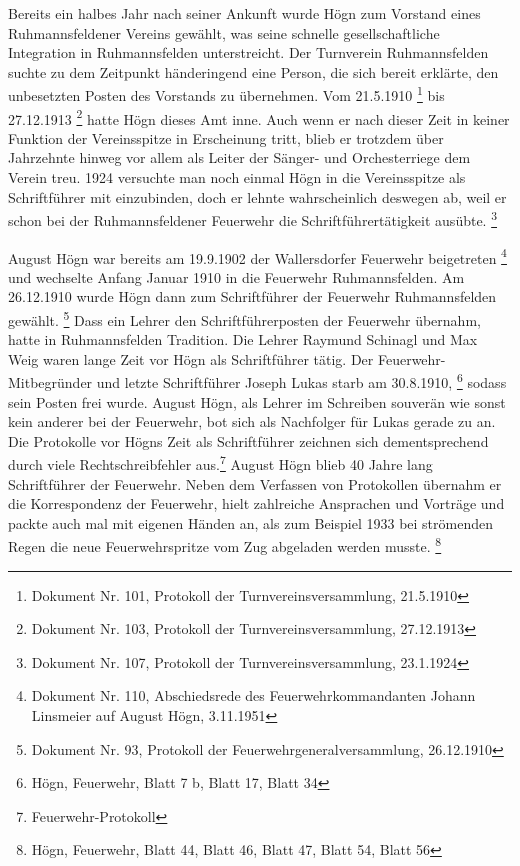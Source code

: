 \documentclass[a4paper]{article}
\begin{document}
Bereits ein halbes Jahr nach seiner Ankunft wurde Högn zum Vorstand
eines Ruhmannsfeldener Vereins gewählt, was seine schnelle
gesellschaftliche Integration in Ruhmannsfelden unterstreicht. Der
Turnverein Ruhmannsfelden suchte zu dem Zeitpunkt händeringend eine
Person, die sich bereit erklärte, den unbesetzten Posten des Vorstands
zu übernehmen. Vom 21.5.1910 \footnote{Dokument Nr. 101, Protokoll der
Turnvereinsversammlung, 21.5.1910}  bis 27.12.1913 \footnote{Dokument
Nr. 103, Protokoll der Turnvereinsversammlung, 27.12.1913} hatte Högn
dieses Amt inne. Auch wenn er nach dieser Zeit in keiner Funktion der
Vereinsspitze in Erscheinung tritt, blieb er trotzdem über Jahrzehnte
hinweg vor allem als Leiter der Sänger- und Orchesterriege dem Verein
treu. 1924 versuchte man noch einmal Högn in die Vereinsspitze als
Schriftführer mit einzubinden, doch er lehnte wahrscheinlich deswegen
ab, weil er schon bei der Ruhmannsfeldener Feuerwehr die
Schriftführertätigkeit ausübte. \footnote{Dokument Nr. 107, Protokoll
der Turnvereinsversammlung, 23.1.1924}

August Högn war bereits am 19.9.1902 der Wallersdorfer Feuerwehr
beigetreten \footnote{Dokument Nr. 110, Abschiedsrede des
Feuerwehrkommandanten Johann Linsmeier auf August Högn, 3.11.1951} und
wechselte Anfang Januar 1910 in die Feuerwehr Ruhmannsfelden. Am
26.12.1910 wurde Högn dann zum Schriftführer der Feuerwehr
Ruhmannsfelden gewählt. \footnote{Dokument Nr. 93, Protokoll der
Feuerwehrgeneralversammlung, 26.12.1910} Dass ein Lehrer den
Schriftführerposten der Feuerwehr übernahm, hatte in Ruhmannsfelden
Tradition. Die Lehrer Raymund Schinagl und Max Weig waren lange Zeit
vor Högn als Schriftführer tätig. Der Feuerwehr-Mitbegründer und letzte
Schriftführer Joseph Lukas starb am 30.8.1910, \footnote{Högn,
Feuerwehr, Blatt 7 b, Blatt 17, Blatt 34} sodass sein Posten frei
wurde. August Högn, als Lehrer im Schreiben souverän wie sonst kein
anderer bei der Feuerwehr, bot sich als Nachfolger für Lukas gerade zu
an. Die Protokolle vor Högns Zeit als Schriftführer zeichnen sich
dementsprechend durch viele Rechtschreibfehler aus.\footnote{
Feuerwehr-Protokoll} August Högn blieb 40 Jahre lang Schriftführer der
Feuerwehr. Neben dem Verfassen von Protokollen übernahm er die
Korrespondenz der Feuerwehr, hielt zahlreiche Ansprachen und Vorträge
und packte auch mal mit eigenen Händen an, als zum Beispiel 1933 bei
strömenden Regen die neue Feuerwehrspritze vom Zug abgeladen werden
musste. \footnote{Högn, Feuerwehr, Blatt 44, Blatt 46, Blatt 47, Blatt
54, Blatt 56}
\end{document}
